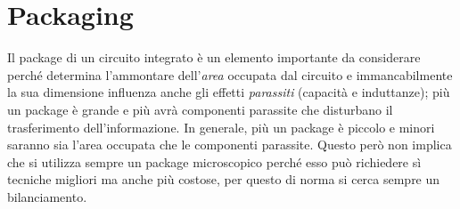 \documentclass[12pt, a4paper]{report}
\begin{document}
\section{Packaging}
Il package di un circuito integrato è un elemento importante da considerare perché determina l'ammontare dell'\textit{area} occupata dal circuito e immancabilmente la sua dimensione influenza anche gli effetti \textit{parassiti} (capacità e induttanze); più un package è grande e più avrà componenti parassite che disturbano il trasferimento dell'informazione. In generale, più un package è piccolo e minori saranno sia l'area occupata che le componenti parassite. Questo però non implica che si utilizza sempre un package microscopico perché esso può richiedere sì tecniche migliori ma anche più costose, per questo di norma si cerca sempre un bilanciamento.
\end{document}
